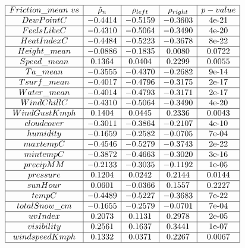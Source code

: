 \documentclass[12pt, bachelor, substylefile = algo_title.rtx]{disser}
\theoremstyle{definition}
\begin{document}
\begin{table}[!h]
$$
\begin{array}{|c|c|c|c|c|}
\hline
Friction\_mean\ vs & \hat\rho_n & \rho_{left} & \rho_{right} & p-value\\
\hline
DewPointC & -0.4414 & -0.5159 & -0.3603 & 4\text{e-21}\\
\hline
FeelsLikeC & -0.4310 & -0.5064 & -0.3490 & 4\text{e-20}\\
\hline
HeatIndexC & -0.4484 & -0.5223 & -0.3678 & 8\text{e-22}\\
\hline
Height\_mean & -0.0886 & -0.1835 & 0.0080 & 0.0722\\
\hline
Speed\_mean & 0.1364 & 0.0404 & 0.2299& 0.0055\\
\hline
Ta\_mean& -0.3555 & -0.4370 & -0.2682 & 9\text{e-14}\\
\hline
Tsurf\_mean & -0.4017 & -0.4796 & -0.3175 & 2\text{e-17}\\
\hline
Water\_mean & -0.4014 &-0.4793 & -0.3171 & 2\text{e-17}\\
\hline
WindChillC & -0.4310 & -0.5064 & -0.3490 & 4\text{e-20}\\
\hline
WindGustKmph & 0.1404 & 0.0445 & 0.2336 & 0.0043\\
\hline
cloudcover & -0.3011 & -0.3864 & -0.2107 & 4\text{e-10}\\
\hline
humidity & -0.1659 & -0.2582 & -0.0705& 7\text{e-04}\\
\hline
maxtempC & -0.4546 & -0.5279 & -0.3743 & 2\text{e-22}\\
\hline
mintempC & -0.3872 & -0.4663 & -0.3020 & 3\text{e-16}\\
\hline
precipMM & -0.2133 & -0.3035 & -0.1192 & 1\text{e-05}\\
\hline
pressure & 0.1204 & 0.0242 & 0.2144 & 0.0144 \\
\hline
sunHour & 0.0601 & -0.0366 & 0.1557 & 0.2227\\
\hline
tempC & -0.4489 & -0.5227 & -0.3683 & 7\text{e-22}\\
\hline
totalSnow\_cm & -0.1655 & -0.2579 & -0.0701 & 7\text{e-04}\\
\hline
uvIndex & 0.2073 & 0.1131 & 0.2978 & 2\text{e-05}\\
\hline
visibility & 0.2561 & 0.1637 & 0.3441 & 1\text{e-07}\\
\hline
windspeedKmph & 0.1332 & 0.0371 & 0.2267 & 0.0067\\
\hline
\end{array}
$$

\caption{Correlation significance of Friction\_mean vs others test results}
\label{tab: 3}
\end{table}
\end{document}
